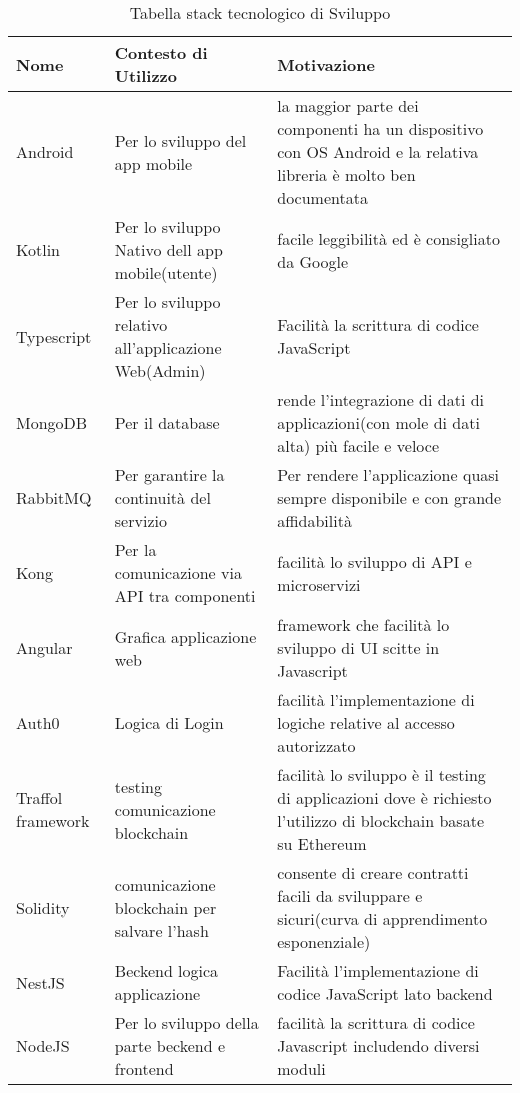 \begin{enumerate}
    \begin{longtable}{ C{5cm} C{4cm} C{5cm} }
        \caption{Tabella stack tecnologico di Sviluppo}                                                                                 \\
        \rowcolor{\primaryColor}
        \textcolor{\secondaryColor}{\textbf{Nome}} & \textcolor{\secondaryColor}{\textbf{Contesto di Utilizzo}} & \textcolor{\secondaryColor}{\textbf{Motivazione}}\\ \endhead
        {Android} & {Per lo sviluppo del app mobile}   & {la maggior parte dei componenti ha un dispositivo con OS Android e la relativa libreria è molto ben documentata}\\
        {Kotlin} & {Per lo sviluppo Nativo dell app mobile(utente)} & {facile leggibilità ed è consigliato da Google} \\
        {Typescript} & {Per lo sviluppo relativo all'applicazione Web(Admin)} & { Facilità la scrittura di codice JavaScript } \\
        {MongoDB} & {Per il database} & { rende l'integrazione di dati di applicazioni(con mole di dati alta) più facile e veloce} \\
        {RabbitMQ} & {Per garantire la continuità del servizio} & {Per rendere l'applicazione quasi sempre disponibile e con grande affidabilità} \\
        {Kong} & {Per la comunicazione via API tra componenti} & {facilità lo sviluppo di API e microservizi} \\
        {Angular} & {Grafica applicazione web} & {framework che facilità lo sviluppo di UI scitte in Javascript} \\
        {Auth0} & {Logica di Login} & {facilità l'implementazione di logiche relative al accesso autorizzato} \\
        {Traffol framework} & {testing comunicazione blockchain} & {facilità lo sviluppo è il testing di applicazioni dove è richiesto l'utilizzo di blockchain basate su Ethereum} \\
        {Solidity} & {comunicazione blockchain per salvare l'hash} & {consente di creare contratti facili da sviluppare e sicuri(curva di apprendimento esponenziale)} \\
        {NestJS} & {Beckend logica applicazione} & {Facilità l'implementazione di codice JavaScript lato backend} \\
        {NodeJS} & {Per lo sviluppo della parte beckend e frontend} & {facilità la scrittura di codice Javascript includendo diversi moduli} \\
    \end{longtable}
    

\end{enumerate}
